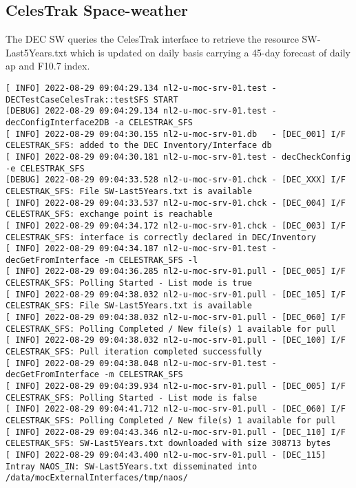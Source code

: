 \documentclass[dec_sum_main.tex]{subfiles}
\begin{document}
\subsection{CelesTrak Space-weather }
The DEC SW queries the CelesTrak interface to retrieve the resource SW-Last5Years.txt which is updated on daily basis carrying a 45-day forecast of daily ap and F10.7 index.

 \newline

\begin{Verbatim}[fontsize=\tiny]
[ INFO] 2022-08-29 09:04:29.134 nl2-u-moc-srv-01.test - DECTestCaseCelesTrak::testSFS START
[DEBUG] 2022-08-29 09:04:29.134 nl2-u-moc-srv-01.test - decConfigInterface2DB -a CELESTRAK_SFS
[ INFO] 2022-08-29 09:04:30.155 nl2-u-moc-srv-01.db   - [DEC_001] I/F CELESTRAK_SFS: added to the DEC Inventory/Interface db
[ INFO] 2022-08-29 09:04:30.181 nl2-u-moc-srv-01.test - decCheckConfig -e CELESTRAK_SFS
[DEBUG] 2022-08-29 09:04:33.528 nl2-u-moc-srv-01.chck - [DEC_XXX] I/F CELESTRAK_SFS: File SW-Last5Years.txt is available
[ INFO] 2022-08-29 09:04:33.537 nl2-u-moc-srv-01.chck - [DEC_004] I/F CELESTRAK_SFS: exchange point is reachable 
[ INFO] 2022-08-29 09:04:34.172 nl2-u-moc-srv-01.chck - [DEC_003] I/F CELESTRAK_SFS: interface is correctly declared in DEC/Inventory
[ INFO] 2022-08-29 09:04:34.187 nl2-u-moc-srv-01.test - decGetFromInterface -m CELESTRAK_SFS -l
[ INFO] 2022-08-29 09:04:36.285 nl2-u-moc-srv-01.pull - [DEC_005] I/F CELESTRAK_SFS: Polling Started - List mode is true
[ INFO] 2022-08-29 09:04:38.032 nl2-u-moc-srv-01.pull - [DEC_105] I/F CELESTRAK_SFS: File SW-Last5Years.txt is available
[ INFO] 2022-08-29 09:04:38.032 nl2-u-moc-srv-01.pull - [DEC_060] I/F CELESTRAK_SFS: Polling Completed / New file(s) 1 available for pull
[ INFO] 2022-08-29 09:04:38.032 nl2-u-moc-srv-01.pull - [DEC_100] I/F CELESTRAK_SFS: Pull iteration completed successfully
[ INFO] 2022-08-29 09:04:38.048 nl2-u-moc-srv-01.test - decGetFromInterface -m CELESTRAK_SFS
[ INFO] 2022-08-29 09:04:39.934 nl2-u-moc-srv-01.pull - [DEC_005] I/F CELESTRAK_SFS: Polling Started - List mode is false
[ INFO] 2022-08-29 09:04:41.712 nl2-u-moc-srv-01.pull - [DEC_060] I/F CELESTRAK_SFS: Polling Completed / New file(s) 1 available for pull
[ INFO] 2022-08-29 09:04:43.346 nl2-u-moc-srv-01.pull - [DEC_110] I/F CELESTRAK_SFS: SW-Last5Years.txt downloaded with size 308713 bytes
[ INFO] 2022-08-29 09:04:43.400 nl2-u-moc-srv-01.pull - [DEC_115] Intray NAOS_IN: SW-Last5Years.txt disseminated into /data/mocExternalInterfaces/tmp/naos/

\end{Verbatim}
\end{document}
